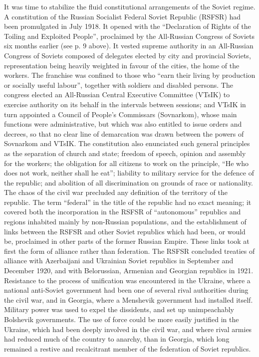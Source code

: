 It was time to stabilize the fluid constitutional arrangements of the Soviet regime. A constitution of the Russian Socialist Federal Soviet Republic (RSFSR) had been promulgated in July 1918. It opened with the ``Declaration of Rights of the Toiling and Exploited People'', proclaimed by the All-Russian Congress of Soviets six months earlier (see p. 9 above). It vested supreme authority in an All-Russian Congress of Soviets composed of delegates elected by city and provincial Soviets, representation being heavily weighted in favour of the cities, the home of the workers. The franchise was confined to those who ``earn their living by production or socially useful labour'', together with soldiers and disabled persons. The congress elected an All-Russian Central Executive Committee (VTsIK) to exercise authority on its behalf in the intervals between sessions; and VTsIK in turn appointed a Council of People's Commissars (Sovnarkom), whose main functions were administrative, but which was also entitled to issue orders and decrees, so that no clear line of demarcation was drawn between the powers of Sovnarkom and VTsIK. The constitution also enunciated such general principles as the separation of church and state; freedom of speech, opinion and assembly for the workers; the obligation for all citizens to work on the principle, ``He who does not work, neither shall he eat''; liability to military service for the defence of the republic; and abolition of all discrimination on grounds of race or nationality. The chaos of the civil war precluded any definition of the territory of the republic. The term ``federal'' in the title of the republic had no exact meaning; it covered both the incorporation in the RSFSR of ``autonomous'' republics and regions inhabited mainly by non-Russian populations, and the establishment of links between the RSFSR and other Soviet republics which had been, or would be, proclaimed in other parts of the former Russian Empire. These links took at first the form of alliance rather than federation. The RSFSR concluded treaties of alliance with Azerbaijani and Ukrainian Soviet republics in September and December 1920, and with Belorussian, Armenian and Georgian republics in 1921. Resistance to the process of unification was encountered in the Ukraine, where a national anti-Soviet government had been one of several rival authorities during the civil war, and in Georgia, where a Menshevik government had installed itself. Military power was used to expel the dissidents, and set up unimpeachably Bolshevik governments. The use of force could be more easily justified in the Ukraine, which had been deeply involved in the civil war, and where rival armies had reduced much of the country to anarchy, than in Georgia, which long remained a restive and recalcitrant member of the federation of Soviet republics. 

